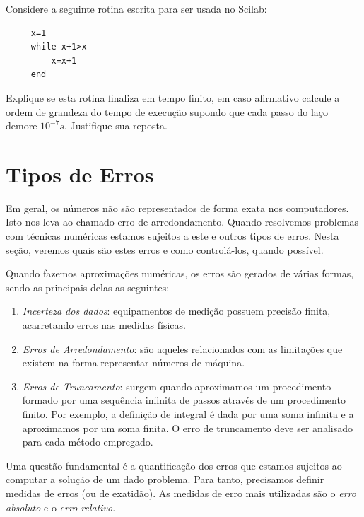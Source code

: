 \ifisscilab
\begin{exer}Considere a seguinte rotina escrita para ser usada no Scilab:
 \begin{verbatim}
     x=1
     while x+1>x
         x=x+1
     end
 \end{verbatim}
 Explique se esta rotina finaliza em tempo finito, em caso afirmativo calcule a ordem de grandeza do tempo de execução supondo que cada passo do laço demore $10^{-7}s$. Justifique sua reposta.
 \end{exer}
\fi

\section{Tipos de Erros}

Em geral, os números não são representados de forma exata nos computadores. Isto nos leva ao chamado erro de arredondamento. Quando resolvemos problemas com técnicas numéricas estamos sujeitos a este e outros tipos de erros. Nesta seção, veremos quais são estes erros e como controlá-los, quando possível.

Quando fazemos aproximações numéricas, os erros são gerados de várias formas, sendo as principais delas as seguintes:
\begin{enumerate}
 \item \emph{Incerteza dos dados}: equipamentos de medição possuem precisão finita, acarretando erros nas medidas físicas.
 \item \emph{Erros de Arredondamento}: são aqueles relacionados com as limitações que existem na forma representar números de máquina. 
 \item \emph{Erros de Truncamento}: surgem quando aproximamos um procedimento formado por uma sequência infinita de passos através de um procedimento finito. Por exemplo, a definição de integral é dada por uma soma infinita e a aproximamos por um soma finita. O erro de truncamento deve ser analisado para cada método empregado. 
\end{enumerate}

Uma questão fundamental é a quantificação dos erros que estamos sujeitos ao computar a solução de um dado problema. Para tanto, precisamos definir medidas de erros (ou de exatidão). As medidas de erro mais utilizadas são o \emph{erro absoluto} e o \emph{erro relativo}.

